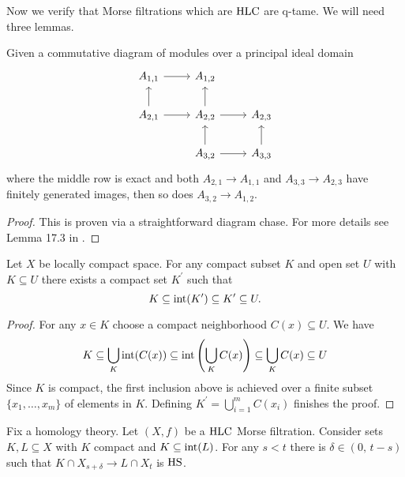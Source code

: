 Now we verify that Morse filtrations which are $\mathrm{HLC}$ are q-tame.
We will need three lemmas. 

\begin{lem} \label{l:commutative algebra}
	Given a commutative diagram of modules over a principal ideal domain
	\begin{equation*}
	\begin{tikzcd}
	A_{1,1} \arrow[r] & A_{1,2} & \\
	A_{2,1} \arrow[r] \arrow[u] & A_{2,2} \arrow[r] \arrow[u] & A_{2,3} \\
	& A_{3,2} \arrow[r] \arrow[u] & A_{3,3} \arrow[u]
	\end{tikzcd}
	\end{equation*}
	where the middle row is exact and both $A_{2,1} \to A_{1,1}$ and $A_{3,3} \to A_{2,3}$ have finitely generated images, then so does $A_{3,2} \to A_{1,2}$.
\end{lem}

\begin{proof}
	This is proven via a straightforward diagram chase. For more details see Lemma 17.3 in \cite{Bredon.1968}.
\end{proof}

\begin{lem} \label{l:neighborhood third}
	Let $X$ be locally compact space.
	For any compact subset $K$ and open set $U$ with $K \subseteq U$ there exists a compact set $K^\prime$ such that
	\begin{equation*}
	K \subseteq \operatorname{int}(K^\prime) \subseteq K^\prime \subseteq U.
	\end{equation*}
\end{lem}

\begin{proof}
	For any $x \in K$ choose a compact neighborhood $C(x) \subseteq U$.
	We have
	\begin{equation*}
	K \subseteq \bigcup_K \operatorname{int}(C(x)) \subseteq \operatorname{int}\left(\bigcup_K C(x)\right) \subseteq \bigcup_K C(x) \subseteq U
	\end{equation*}
	Since $K$ is compact, the first inclusion above is achieved over a finite subset $\{x_1, \dots, x_m\}$ of elements in $K$.
	Defining $K^\prime = \bigcup_{i=1}^m C(x_i)$ finishes the proof.
\end{proof}

\begin{lem} \label{l:key lemma for q-tameness}
	Fix a homology theory. Let $(X,f)$ be a $\mathrm{HLC}$ Morse filtration.
	Consider sets $K, L \subseteq X$ with $K$ compact and $K \subseteq \operatorname{int}(L)$. For any $s < t$ there is $\delta \in (0,\, t-s)$ such that $K \cap X_{s+\delta} \to L \cap X_{t}$ is $\mathrm{HS}$.
\end{lem}


